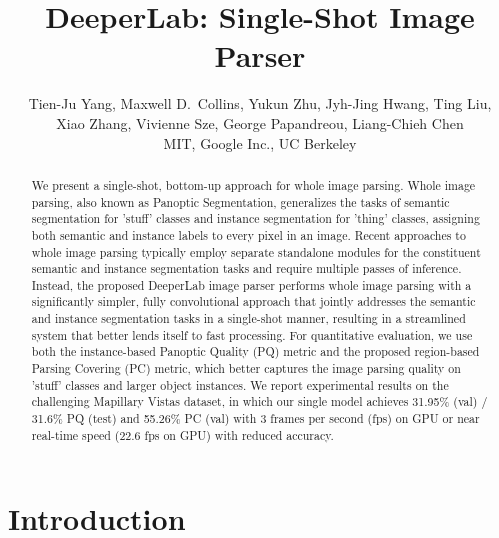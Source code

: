 \documentclass[10pt,twocolumn,letterpaper]{article}
\begin{document}
\title{DeeperLab: Single-Shot Image Parser}

\author{
  \begin{tabular}[t]{c}
Tien-Ju Yang, Maxwell D.~Collins, Yukun Zhu, Jyh-Jing Hwang, Ting Liu, \\
Xiao Zhang, Vivienne Sze, George Papandreou, Liang-Chieh Chen\\
MIT, Google Inc., UC Berkeley \\
\end{tabular}
}

\maketitle



\begin{abstract}
We present a single-shot, bottom-up approach for whole image parsing. Whole image parsing, also known as Panoptic Segmentation, generalizes the tasks of semantic segmentation for 'stuff' classes and instance segmentation for 'thing' classes, assigning both semantic and instance labels to every pixel in an image. Recent approaches to whole image parsing typically employ separate standalone modules for the constituent semantic and instance segmentation tasks and require multiple passes of inference. Instead, the proposed DeeperLab image parser performs whole image parsing with a significantly simpler, fully convolutional approach that jointly addresses the semantic and instance segmentation tasks in a single-shot manner, resulting in a streamlined system that better lends itself to fast processing. For quantitative evaluation, we use both the instance-based Panoptic Quality (PQ) metric and the proposed region-based Parsing Covering (PC) metric, which better captures the image parsing quality on 'stuff' classes and larger object instances. We report experimental results on the challenging Mapillary Vistas dataset, in which our single model achieves 31.95\% (val) / 31.6\% PQ (test) and 55.26\% PC (val) with 3 frames per second (fps) on GPU or near real-time speed (22.6 fps on GPU) with reduced accuracy.
\end{abstract}
 


\section{Introduction}
\label{sec:intro}
\end{document}
